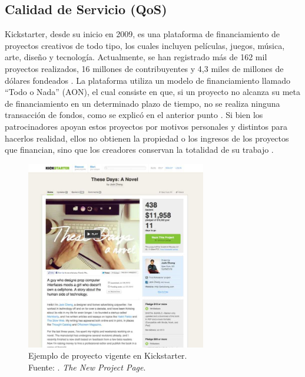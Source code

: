 \subsection{Calidad de Servicio (QoS)}
Kickstarter, desde su inicio en 2009, es una plataforma de financiamiento de proyectos creativos de todo tipo, los cuales incluyen películas, juegos, música, arte, diseño y tecnología. Actualmente, se han registrado más de 162 mil proyectos realizados, 16 millones de contribuyentes y 4,3 miles de millones de dólares fondeados \parencite{cr_kickstarter_about}. La plataforma utiliza un modelo de financiamiento llamado “Todo o Nada” (AON), el cual consiste en que, si un proyecto no alcanza su meta de financiamiento en un determinado plazo de tiempo, no se realiza ninguna transacción de fondos, como se explicó en el anterior punto \parencite{cr_kickstarter_founding}. Si bien los patrocinadores apoyan estos proyectos por motivos personales y distintos para hacerlos realidad, ellos no obtienen la propiedad o los ingresos de los proyectos que financian, sino que los creadores conservan la totalidad de su trabajo \parencite{cr_kickstarter_press}.

\begin{figure}[!ht]
	\begin{center}
		\includegraphics[width=0.70\textwidth]{2/figures/kickstarter_project.jpg}
		\caption[Ejemplo de proyecto vigente en Kickstarter]{Ejemplo de proyecto vigente en Kickstarter.\\
			Fuente: \cite{cr_perry2012kickstarterproject}. \textit{The New Project Page}.}
		\label{2:fig52}
	\end{center}
\end{figure}

